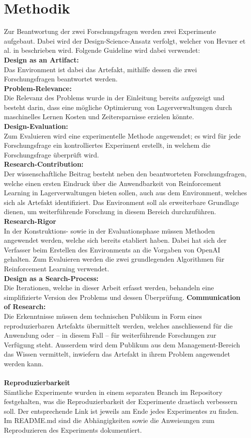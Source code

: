 \chapter{Methodik}
Zur Beantwortung der zwei Forschungsfragen werden zwei Experimente aufgebaut. Dabei wird der Design-Science-Ansatz verfolgt, welcher von Hevner et al. in \cite{dsr} beschrieben wird. Folgende Guideline wird dabei verwendet:\\
\textbf{Design as an Artifact:}\\
Das Environment ist dabei das Artefakt, mithilfe dessen die zwei Forschungsfragen beantwortet werden. \\
\textbf{Problem-Relevance:}\\
Die Relevanz des Problems wurde in der Einleitung bereits aufgezeigt und besteht darin, dass eine mögliche Optimierung von Lagerverwaltungen durch maschinelles Lernen Kosten und Zeitersparnisse erzielen könnte.\\
\textbf{Design-Evaluation:}\\
Zum Evaluieren wird eine experimentelle Methode angewendet; es wird für jede Forschungsfrage ein kontrolliertes Experiment erstellt, in welchem die Forschungsfrage überprüft wird.\\
\textbf{Research-Contribution:}\\
Der wissenschaftliche Beitrag besteht neben den beantworteten Forschungsfragen, welche einen ersten Eindruck über die Anwendbarkeit von Reinforcement Learning in Lagerverwaltungen bieten sollen, auch aus dem Environment, welches sich als Artefakt identifiziert. Das Environment soll als erweiterbare Grundlage dienen, um weiterführende Forschung in diesem Bereich durchzuführen.\\
\textbf{Research-Rigor}\\
In der Konstruktions- sowie in der Evaluationsphase müssen Methoden angewendet werden, welche sich bereits etabliert haben. Dabei hat sich der Verfasser beim Erstellen des Environments an die Vorgaben von OpenAI \cite{gym} gehalten. Zum Evaluieren werden die zwei grundlegenden Algorithmen für Reinforcement Learning verwendet.\\
\textbf{Design as a Search-Process:}\\
Die Iterationen, welche in dieser Arbeit erfasst werden, behandeln eine simplifizierte Version des Problems und dessen Überprüfung.
\newpage
\noindent\textbf{Communication of Research:}\\
Die Erkenntnisse müssen dem technischen Publikum in Form eines reproduzierbaren Artefakts übermittelt werden, welches anschliessend für die Anwendung oder – in diesem Fall – für weiterführende Forschungen zur Verfügung steht. Ausserdem wird dem Publikum aus dem Management-Bereich das Wissen vermittelt, inwiefern das Artefakt in ihrem Problem angewendet werden kann.\\
\smallskip\\
\textbf{Reproduzierbarkeit}\\
Sämtliche Experimente wurden in einem separaten Branch im Repository festgehalten, was die Reproduzierbarkeit der Experimente drastisch verbessern soll. Der entsprechende Link ist jeweils am Ende jedes Experimentes zu finden. Im README.md sind die Abhängigkeiten sowie die Anweisungen zum Reproduzieren des Experiments dokumentiert.
